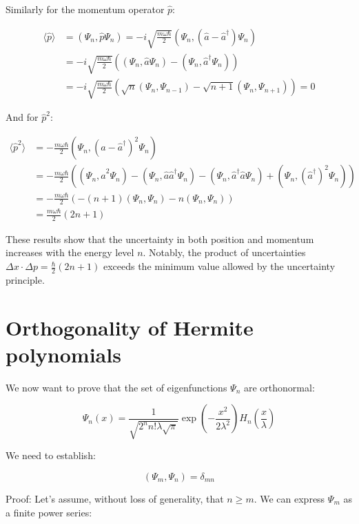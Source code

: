Similarly for the momentum operator $\hat{p}$:

\begin{align}
\langle\hat{p}\rangle &= (\Psi_n, \hat{p}\Psi_n) = -i\sqrt{\frac{m\omega\hbar}{2}}(\Psi_n, (\hat{a}-\hat{a}^\dagger)\Psi_n) \\
&= -i\sqrt{\frac{m\omega\hbar}{2}}((\Psi_n, \hat{a}\Psi_n) - (\Psi_n, \hat{a}^\dagger\Psi_n)) \\
&= -i\sqrt{\frac{m\omega\hbar}{2}}(\sqrt{n}(\Psi_n, \Psi_{n-1}) - \sqrt{n+1}(\Psi_n, \Psi_{n+1})) = 0
\end{align}

And for $\hat{p}^2$:

\begin{align}
\langle\hat{p}^2\rangle &= -\frac{m\omega\hbar}{2}(\Psi_n, (\hat{a}-\hat{a}^\dagger)^2\Psi_n) \\
&= -\frac{m\omega\hbar}{2}((\Psi_n, \hat{a}^2\Psi_n) - (\Psi_n, \hat{a}\hat{a}^\dagger\Psi_n) - (\Psi_n, \hat{a}^\dagger\hat{a}\Psi_n) + (\Psi_n, (\hat{a}^\dagger)^2\Psi_n)) \\
&= -\frac{m\omega\hbar}{2}(-(n+1)(\Psi_n, \Psi_n) - n(\Psi_n, \Psi_n)) \\
&= \frac{m\omega\hbar}{2}(2n+1)
\end{align}

These results show that the uncertainty in both position and momentum increases with the energy level $n$. Notably, the product of uncertainties $\Delta x \cdot \Delta p = \frac{\hbar}{2}(2n+1)$ exceeds the minimum value allowed by the uncertainty principle.

\section{Orthogonality of Hermite polynomials}

We now want to prove that the set of eigenfunctions $\Psi_n$ are orthonormal:

\begin{equation}
\Psi_n(x) = \frac{1}{\sqrt{2^n n!\lambda\sqrt{\pi}}}\exp\left(-\frac{x^2}{2\lambda^2}\right)H_n\left(\frac{x}{\lambda}\right)
\end{equation}

We need to establish:

\begin{equation}
(\Psi_m, \Psi_n) = \delta_{mn}
\end{equation}

Proof: Let's assume, without loss of generality, that $n \geq m$. We can express $\Psi_m$ as a finite power series:

